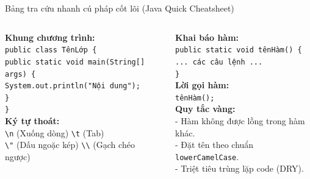 \documentclass[aspectratio=169, 10pt]{beamer}
\begin{document}
\begin{frame}{Bảng tra cứu nhanh cú pháp cốt lõi (Java Quick Cheatsheet)}
  \begin{columns}[t]
    \begin{tcolorbox}[colback=white,colframe=UniNavy,title=\textbf{Cấu trúc chương trình \& Xuất màn hình}]
      \footnotesize
      \textbf{Khung chương trình:}\\
      \texttt{public class TênLớp \{}\\
      \quad\texttt{public static void main(String[] args) \{}\\
      \qquad\texttt{System.out.println("Nội dung");}\\
      \quad\texttt{\}}\\
      \texttt{\}}\\[2mm]
      \textbf{Ký tự thoát:}\\
      \texttt{\textbackslash n} (Xuống dòng) \quad \texttt{\textbackslash t} (Tab)\\
      \texttt{\textbackslash"} (Dấu ngoặc kép) \quad \texttt{\textbackslash\textbackslash} (Gạch chéo ngược)
    \end{tcolorbox}

    \begin{tcolorbox}[colback=white,colframe=UniBlue,title=\textbf{Phương thức tĩnh \& Phân rã}]
      \footnotesize
      \textbf{Khai báo hàm:}\\
      \texttt{public static void tênHàm() \{}\\
      \quad\texttt{... các câu lệnh ...}\\
      \texttt{\}}\\[2mm]
      \textbf{Lời gọi hàm:}\\
      \texttt{tênHàm();}\\[2mm]
      \textbf{Quy tắc vàng:}\\
      - Hàm không được lồng trong hàm khác.\\
      - Đặt tên theo chuẩn \texttt{lowerCamelCase}.\\
      - Triệt tiêu trùng lặp code (DRY).
    \end{tcolorbox}
  \end{columns}
\end{frame}
\end{document}

